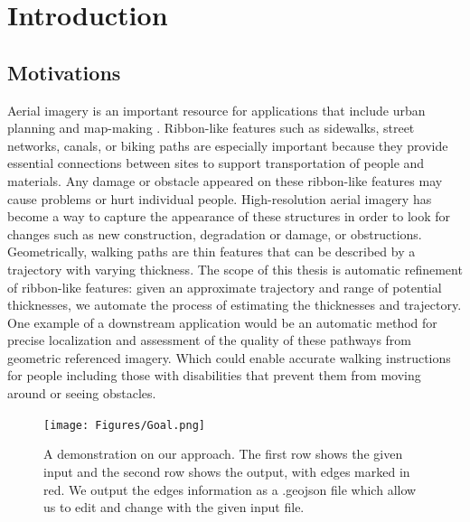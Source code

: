 \chapter{Introduction}

\section{Motivations}
Aerial imagery is an important resource for applications that include urban planning and map-making \cite{5523977}. Ribbon-like features such as sidewalks, street networks, canals, or biking paths are especially important because they provide essential connections between sites to support transportation of people and materials. Any damage or obstacle appeared on these ribbon-like features may cause problems or hurt individual people. High-resolution aerial imagery has become a way to capture the appearance of these structures in order to look for changes such as new construction, degradation or damage, or obstructions. Geometrically, walking paths are thin features that can be described by a trajectory with varying thickness\cite{10.1007/11744078_9}. The scope of this thesis is automatic refinement of ribbon-like features: given an approximate trajectory and range of potential thicknesses, we automate the process of estimating the thicknesses and trajectory. One example of a downstream application would be an automatic method for precise localization and assessment of the quality of these pathways from geometric referenced imagery. Which could enable accurate walking instructions for people including those with disabilities that prevent them from moving around or seeing obstacles\cite{ZOU2012227}. 

\begin{figure}
    \centering
    \texttt{[image: Figures/Goal.png]}
    \caption[Objective Demonstration]{A demonstration on our approach. The first row shows the given input and the second row shows the output, with edges marked in red. We output the edges information as a .geojson file which allow us to edit and change with the given input file.}
    \label{fig:goal}
\end{figure}


